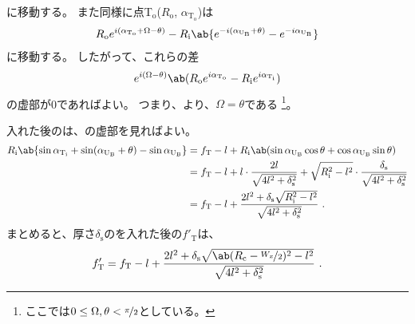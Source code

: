 に移動する。
また同様に点T$_\mathrm o$($R_\mathrm o$, $\alpha_{\mathrm T_\mathrm o}$)は
\begin{align*}
  \notag
  R_\mathrm oe^{i(\alpha_{\mathrm T_\mathrm o} + \Omega - \theta)}
  -R_\mathrm i\ab\{e^{-i(\alpha_{\mathrm U_\mathrm B} + \theta)}-e^{-i\alpha_{\mathrm U_\mathrm B}}\}
\end{align*}
に移動する。
したがって、これらの差
\begin{align*}
  \notag
  e^{i(\Omega - \theta)}\ab(R_\mathrm oe^{i\alpha_{\mathrm T_\mathrm o}} - R_\mathrm ie^{i\alpha_{\mathrm T_\mathrm i}})
\end{align*}
の虚部が0であればよい。
つまり、より、$\Omega = \theta$である
\footnote{ここでは$0 \leq \Omega, \theta < \nicefrac \pi2$としている。}。

\Spacer 入れた後の\TopAlocationLength は、の虚部を見ればよい。
\begin{align*}
  R_\mathrm i\ab\{\sin\alpha_{\mathrm T_\mathrm i} + \sin(\alpha_{\mathrm U_\mathrm B} + \theta) - \sin\alpha_{\mathrm U_\mathrm B}\}
  &= f_\mathrm T -l
     +R_\mathrm i\ab(\sin\alpha_{\mathrm U_\mathrm B}\cos\theta + \cos\alpha_{\mathrm U_\mathrm B}\sin\theta)\\
  &= f_\mathrm T -l+l\cdot\frac{2l}{\sqrt{4l^2+\delta_\mathrm s^2}}
     +\sqrt{R_\mathrm i^2-l^2}\cdot\frac{\delta_\mathrm s}{\sqrt{4l^2+\delta_\mathrm s^2}}\\
  &= f_\mathrm T -l+\frac{2l^2+\delta_\mathrm s\sqrt{R_\mathrm i^2-l^2}}{\sqrt{4l^2+\delta_\mathrm s^2}}~.
\end{align*}
まとめると、厚さ$\delta_\mathrm s$の\Spacer を入れた後の\TopAlocationLength$f'_\mathrm T$は、
\begin{align}
  \label{eq:fTprime}
  f'_\mathrm T
  = f_\mathrm T -l
    +\frac{2l^2+\delta_\mathrm s\sqrt{\ab(R_\mathrm c-\nicefrac{W_x}2)^2-l^2}}{\sqrt{4l^2+\delta_\mathrm s^2}}~.
\end{align}


